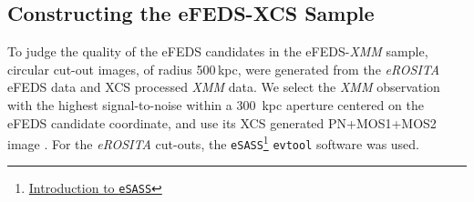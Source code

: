 \documentclass[fleqn,usenatbib]{mnras}
\begin{document}




\subsection{Constructing the eFEDS-XCS Sample}
\label{sec:efeds-verification}

To judge the quality of the eFEDS candidates in the eFEDS-{\em XMM} sample, circular cut-out images, of radius 500\,kpc, were generated from the {\em eROSITA} eFEDS data and XCS processed {\em XMM} data. We select the {\em XMM} observation with the highest signal-to-noise within a 300~kpc aperture centered on the eFEDS candidate coordinate, and use its XCS generated PN+MOS1+MOS2 image \citep[][]{xcsgiles}. For the {\em eROSITA} cut-outs, the \texttt{eSASS}\footnote{\href{https://erosita.mpe.mpg.de/edr/DataAnalysis/}{Introduction to \texttt{eSASS}}} \texttt{evtool} software was used. 
\end{document}
